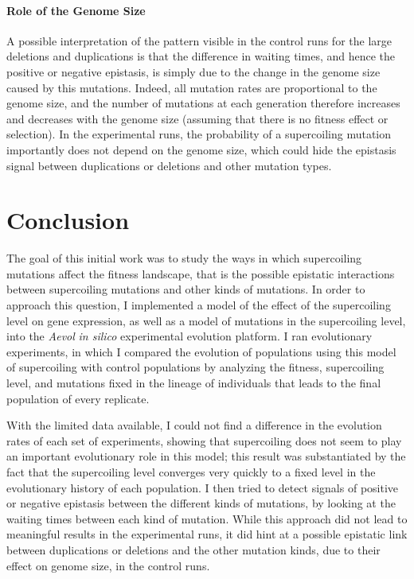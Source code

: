 \paragraph{Role of the Genome Size}
A possible interpretation of the pattern visible in the control runs for the large deletions and duplications is that the difference in waiting times, and hence the positive or negative epistasis, is simply due to the change in the genome size caused by this mutations.
Indeed, all mutation rates are proportional to the genome size, and the number of mutations at each generation therefore increases and decreases with the genome size (assuming that there is no fitness effect or selection).
In the experimental runs, the probability of a supercoiling mutation importantly does not depend on the genome size, which could hide the epistasis signal between duplications or deletions and other mutation types.


\section{Conclusion}
\label{sec:aevol:ccl}

The goal of this initial work was to study the ways in which supercoiling mutations affect the fitness landscape, that is the possible epistatic interactions between supercoiling mutations and other kinds of mutations.
In order to approach this question, I implemented a model of the effect of the supercoiling level on gene expression, as well as a model of mutations in the supercoiling level, into the \emph{Aevol} \emph{in silico} experimental evolution platform.
I ran evolutionary experiments, in which I compared the evolution of populations using this model of supercoiling with control populations by analyzing the fitness, supercoiling level, and mutations fixed in the lineage of individuals that leads to the final population of every replicate.

With the limited data available, I could not find a difference in the evolution rates of each set of experiments, showing that supercoiling does not seem to play an important evolutionary role in this model; this result was substantiated by the fact that the supercoiling level converges very quickly to a fixed level in the evolutionary history of each population.
I then tried to detect signals of positive or negative epistasis between the different kinds of mutations, by looking at the waiting times between each kind of mutation.
While this approach did not lead to meaningful results in the experimental runs, it did hint at a possible epistatic link between duplications or deletions and the other mutation kinds, due to their effect on genome size, in the control runs.

